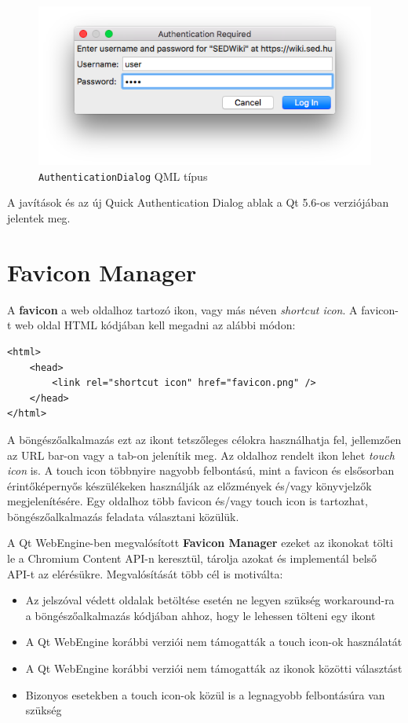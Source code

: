 \documentclass[12pt]{report}
\begin{document}
\begin{figure}[ht]
    \centering
    \includegraphics[scale=0.75]{ad-quick-screenshot}
    \caption{
        \label{fig:ad-quick-screenshot}
        \texttt{AuthenticationDialog} QML típus
    }
\end{figure}

A javítások és az új Quick Authentication Dialog ablak a Qt 5.6-os verziójában jelentek meg.


\section{Favicon Manager}

\noindent
A \textbf{favicon} a web oldalhoz tartozó ikon, vagy más néven \textit{shortcut icon}. A
favicon-t web oldal HTML kódjában kell megadni az alábbi módon:
\begin{verbatim}
<html>
    <head>
        <link rel="shortcut icon" href="favicon.png" />
    </head>
</html>
\end{verbatim}
A böngészőalkalmazás ezt az ikont tetszőleges célokra használhatja fel, jellemzően az URL
bar-on vagy a tab-on jelenítik meg.
Az oldalhoz rendelt ikon lehet \textit{touch icon} is. A touch icon többnyire nagyobb
felbontású, mint a favicon és elsősorban érintőképernyős készülékeken használják az
előzmények és/vagy könyvjelzők megjelenítésére. Egy oldalhoz több favicon és/vagy touch icon
is tartozhat, böngészőalkalmazás feladata választani közülük.

A Qt WebEngine-ben megvalósított \textbf{Favicon Manager} ezeket az ikonokat tölti le a
Chromium Content API-n keresztül, tárolja azokat és implementál belső API-t az elérésükre.
Megvalósítását több cél is motiválta:
\begin{itemize}
    \item Az jelszóval védett oldalak betöltése esetén ne legyen szükség workaround-ra a
        böngészőalkalmazás kódjában ahhoz, hogy le lehessen tölteni egy ikont
    \item A Qt WebEngine korábbi verziói nem támogatták a touch icon-ok használatát
    \item A Qt WebEngine korábbi verziói nem támogatták az ikonok közötti választást
    \item Bizonyos esetekben a touch icon-ok közül is a legnagyobb felbontásúra van szükség
\end{itemize}
\end{document}
